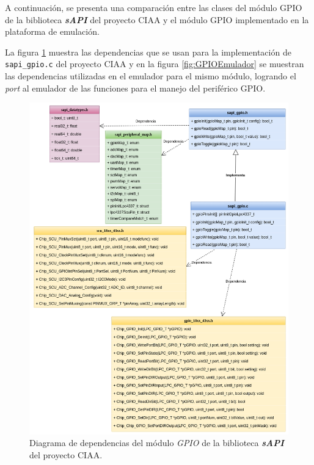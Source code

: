 A continuación, se presenta una comparación entre las clases del módulo GPIO de la biblioteca \textit{\textbf{sAPI}} del proyecto CIAA y el módulo GPIO implementado en la plataforma de emulación. 

La figura \ref{fig:GPIOsAPI} muestra las dependencias que se usan para la implementación de \newline \texttt{sapi\_gpio.c} del proyecto CIAA y en la figura \ref{fig:GPIOEmulador} se muestran las dependencias utilizadas en el emulador para el mismo módulo, logrando el \textit{port} al emulador de las funciones para el manejo del periférico GPIO.




\begin{figure}[ht]
	\centering
	\includegraphics[scale=.41]{./Figures/DiagramaClasesGPIOsAPI.png}
	\caption{Diagrama de dependencias del módulo \textit{GPIO} de la biblioteca \textit{\textbf{sAPI}} del proyecto CIAA.}
	\label{fig:GPIOsAPI}
\end{figure}



